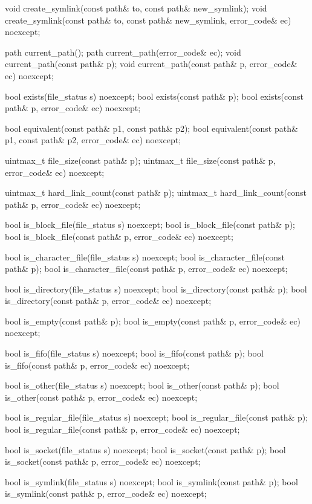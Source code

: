 \begin{codeblock}
{  void create_symlink(const path& to, const path& new_symlink);
  void create_symlink(const path& to, const path& new_symlink,
                      error_code& ec) noexcept;

  path current_path();
  path current_path(error_code& ec);
  void current_path(const path& p);
  void current_path(const path& p, error_code& ec) noexcept;

  bool exists(file_status s) noexcept;
  bool exists(const path& p);
  bool exists(const path& p, error_code& ec) noexcept;

  bool equivalent(const path& p1, const path& p2);
  bool equivalent(const path& p1, const path& p2, error_code& ec) noexcept;

  uintmax_t file_size(const path& p);
  uintmax_t file_size(const path& p, error_code& ec) noexcept;

  uintmax_t hard_link_count(const path& p);
  uintmax_t hard_link_count(const path& p, error_code& ec) noexcept;

  bool is_block_file(file_status s) noexcept;
  bool is_block_file(const path& p);
  bool is_block_file(const path& p, error_code& ec) noexcept;

  bool is_character_file(file_status s) noexcept;
  bool is_character_file(const path& p);
  bool is_character_file(const path& p, error_code& ec) noexcept;

  bool is_directory(file_status s) noexcept;
  bool is_directory(const path& p);
  bool is_directory(const path& p, error_code& ec) noexcept;

  bool is_empty(const path& p);
  bool is_empty(const path& p, error_code& ec) noexcept;

  bool is_fifo(file_status s) noexcept;
  bool is_fifo(const path& p);
  bool is_fifo(const path& p, error_code& ec) noexcept;

  bool is_other(file_status s) noexcept;
  bool is_other(const path& p);
  bool is_other(const path& p, error_code& ec) noexcept;

  bool is_regular_file(file_status s) noexcept;
  bool is_regular_file(const path& p);
  bool is_regular_file(const path& p, error_code& ec) noexcept;

  bool is_socket(file_status s) noexcept;
  bool is_socket(const path& p);
  bool is_socket(const path& p, error_code& ec) noexcept;

  bool is_symlink(file_status s) noexcept;
  bool is_symlink(const path& p);
  bool is_symlink(const path& p, error_code& ec) noexcept;

}
\end{codeblock}
